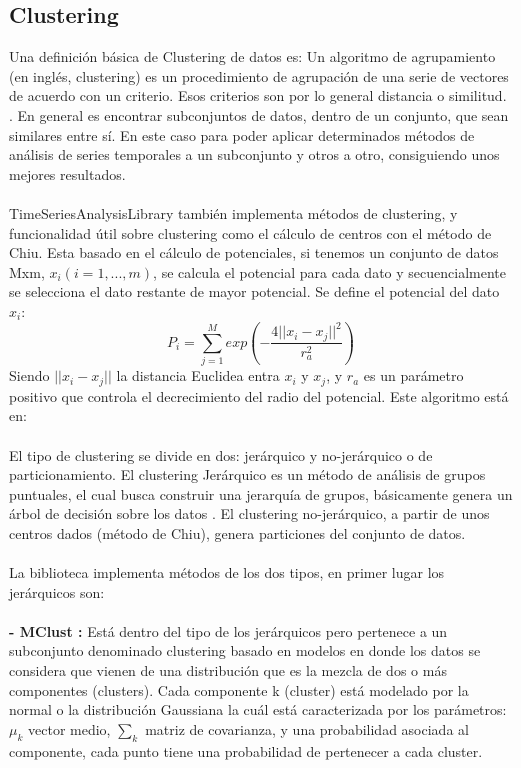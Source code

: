 \documentclass[14pt]{extarticle}
\theoremstyle{definition}
\theoremstyle{remark}
\begin{document}
\subsection{Clustering}\label{sec:clustering}
Una definición básica de Clustering de datos es: Un algoritmo de agrupamiento (en inglés, clustering) es un procedimiento de agrupación de una serie de vectores de acuerdo con un criterio. Esos criterios son por lo general distancia o similitud. \citep{wiki:clustering}. En general es encontrar subconjuntos de datos, dentro de un conjunto, que sean similares entre sí. En este caso para poder aplicar determinados métodos de análisis de series temporales a un subconjunto y otros a otro, consiguiendo unos mejores resultados.\\\\
TimeSeriesAnalysisLibrary también implementa métodos de clustering, y funcionalidad útil sobre clustering como el cálculo de centros con el método de Chiu. Esta basado en el cálculo de potenciales, si tenemos un conjunto de datos Mxm, $x_i(i=1,...,m)$, se calcula el potencial para cada dato y secuencialmente se selecciona el dato restante de mayor potencial. Se define el potencial del dato $x_i$:
\[P_i=\sum_{j=1}^{M}exp\left(-\frac{4||x_i-x_j||^{2}}{r_a^{2}}\right)\] 
Siendo $||x_i-x_j||$ la distancia Euclidea entra $x_i$ y $x_j$, y $r_a$ es un parámetro positivo que controla el decrecimiento del radio del potencial. Este algoritmo está en: \cite[Chapter~6.1.1]{abe2012neural}\\\\
El tipo de clustering se divide en dos: jerárquico y no-jerárquico o de particionamiento. El clustering Jerárquico es un método de análisis de grupos puntuales, el cual busca construir una jerarquía de grupos, básicamente genera un árbol de decisión sobre los datos \citep{wiki:clusteringjerarquico}. El clustering no-jerárquico, a partir de unos centros dados (método de Chiu), genera particiones del conjunto de datos.\\\\La biblioteca implementa métodos de los dos tipos, en primer lugar los jerárquicos son:\\\\
\textbf{- MClust \citep{web:mclustclustering}:} Está dentro del tipo de los jerárquicos pero pertenece a un subconjunto denominado clustering basado en modelos en donde los datos se considera que vienen de una distribución que es la mezcla de dos o más componentes (clusters). Cada componente k (cluster) está modelado por la normal o la distribución Gaussiana la cuál está caracterizada por los parámetros: $\mu_k$ vector medio, $\sum_k$ matriz de covarianza, y una probabilidad asociada al componente, cada punto tiene una probabilidad de pertenecer a cada cluster.\\\\
\end{document}
